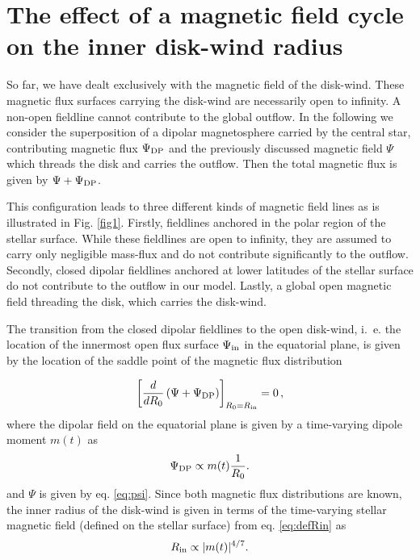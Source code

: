 \documentclass{emulateapj}
\begin{document}

\section{The effect of a magnetic field cycle on the inner disk-wind radius}
\label{variable}

So far, we have dealt exclusively with the magnetic field of the
disk-wind. These magnetic flux surfaces carrying the disk-wind are
necessarily open to infinity. A non-open fieldline cannot contribute
to the global outflow. In the following we consider the superposition
of a dipolar magnetosphere carried by the central star, contributing
magnetic flux $\Psi_{\rm DP}$ and the previously discussed magnetic field
$\Psi$ which threads the disk and carries the outflow. Then the total
magnetic flux is  given by $\Psi + \Psi_{\rm DP}$.

This configuration leads to three
different kinds of magnetic field lines as is illustrated in Fig.
\ref{fig1}. Firstly, fieldlines anchored in the polar region of
the stellar surface. While these fieldlines are open to infinity, they are
assumed to carry only negligible mass-flux and do not contribute
significantly to the outflow.
Secondly, closed dipolar fieldlines anchored at lower latitudes
of the stellar surface do not contribute to the outflow in our
model. Lastly, a global open magnetic field threading the disk, which
carries the disk-wind.

The transition from the closed dipolar fieldlines to the open
disk-wind, i.~e. the location of the innermost open flux surface $\Psi_{\rm in}$
in the equatorial plane, is given by the location of the saddle point
of the magnetic flux distribution

\begin{equation}
 \left[ \frac{d}{dR_0} \left(\Psi + \Psi_{\rm DP} \right) \right]_{R_0=R_{\rm in}} = 0 \,,
 \label{eq:defRin}
\end{equation}
%
where the dipolar field on the equatorial plane is given by a
time-varying dipole moment $m(t)$ as
%
\begin{equation} \label{eq:dipol}
  \Psi_{\rm DP} \propto m(t) \frac{1}{R_0}.
\end{equation}
%
and $\Psi$ is given by eq. \ref{eq:psi}.
Since both magnetic flux distributions are known, the inner radius of
the disk-wind is given in terms of the time-varying stellar magnetic 
field (defined on the stellar surface) from eq. \ref{eq:defRin} as  
\begin{equation}
  R_{\rm in} \propto |m(t)|^{4/7}.
\end{equation}
%
\end{document}
